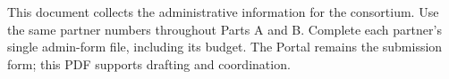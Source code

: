 \documentclass[a4paper,11pt]{article}
\begin{document}
\HEMakeTitle
\begin{heguidance}
This document collects the administrative information for the consortium.
Use the same partner numbers throughout Parts A and B. Complete each partner's
single admin-form file, including its budget. The Portal remains the submission
form; this PDF supports drafting and coordination.
\end{heguidance}





\end{document}
